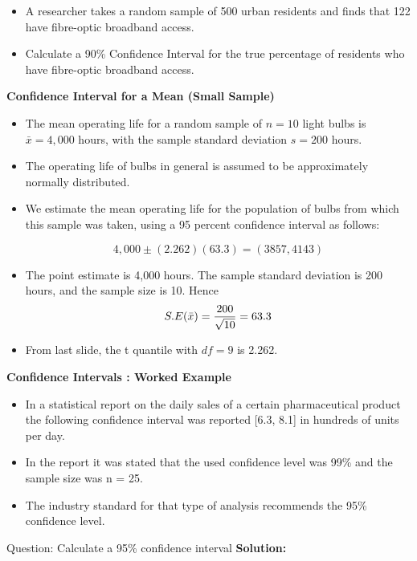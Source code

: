 	
	\item 
	
	
	\begin{itemize}
		\item A researcher takes a random sample of 500 urban residents and finds that
		122 have fibre-optic broadband access. 
		\item Calculate a 90\% Confidence Interval for
		the true percentage of residents who have fibre-optic broadband access.
	\end{itemize}
	
	
	\item \textbf{Confidence Interval for a Mean (Small Sample)} \\
	\begin{itemize}
		\item The mean operating life for a random sample of $n = 10$ light bulbs is $\bar{x} = 4,000$ hours, with the sample
		standard deviation $s = 200$ hours. 
		
		\item The operating life of bulbs in general is assumed to be approximately normally distributed.
		\item We estimate the mean operating life for the population of bulbs from which this sample was taken, using a 95 percent confidence interval as follows:
		
		\[4,000\pm(2.262)(63.3)  = (3857,4143)\]
		
		\item The point estimate is 4,000 hours. The sample standard deviation is 200 hours, and the sample size is 10. Hence
		\[S.E(\bar{x} ) = { 200 \over \sqrt{10}} = 63.3\]
		
		\item From last slide, the t quantile with $df=9$ is 2.262.
	\end{itemize}
	
	\item \textbf{Confidence Intervals : Worked Example}\\
	
	\begin{itemize} 
		\item In a statistical report on the daily sales of a certain pharmaceutical product the following confidence interval was reported [6.3, 8.1] in hundreds of units per day.
		
		\item In the report it was stated that the used confidence level was 99\% and the sample size was n = 25. 
		\item The industry standard for that type of analysis recommends the 95\% confidence level.
	\end{itemize}
	Question: Calculate a 95\% confidence interval
	\textbf{Solution:}
	
